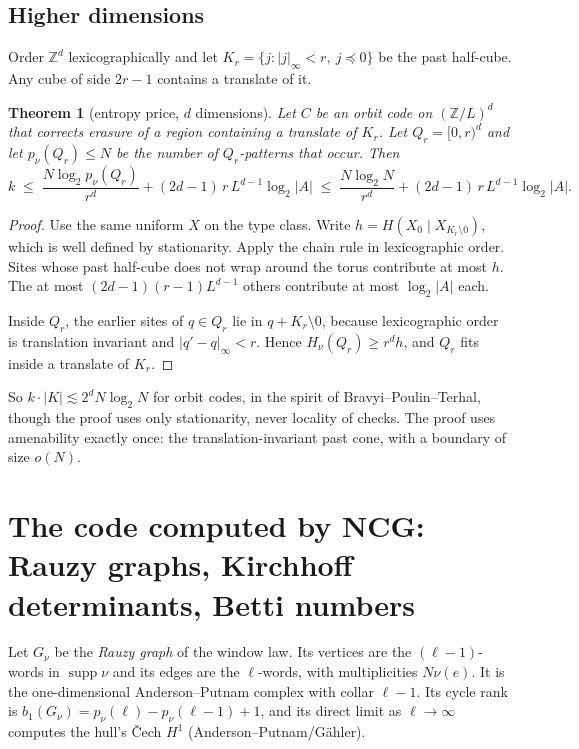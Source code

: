 \documentclass[11pt]{article}
\newtheorem{theorem}{Theorem}[section]
\theoremstyle{definition}
\theoremstyle{remark}
\newcommand{\Z}{\mathbb Z}
\newcommand{\supp}{\operatorname{supp}}
\begin{document}
\subsection{Higher dimensions}
Order $\Z^d$ lexicographically and let $K_r=\{j:|j|_\infty<r,\ j\preceq0\}$ be the past half-cube. Any cube of side $2r-1$ contains a translate of it.

\begin{theorem}[entropy price, $d$ dimensions]\label{thm:priced}
Let $C$ be an orbit code on $(\Z/L)^d$ that corrects erasure of a region containing a translate of $K_r$. Let $Q_r=[0,r)^d$ and let $p_\nu(Q_r)\le N$ be the number of $Q_r$-patterns that occur. Then
\[k\;\le\;\frac{N\log_2p_\nu(Q_r)}{r^d}+(2d-1)\,r\,L^{d-1}\log_2|A|\;\le\;\frac{N\log_2N}{r^d}+(2d-1)\,r\,L^{d-1}\log_2|A|.\]
\end{theorem}

\begin{proof}
Use the same uniform $X$ on the type class. Write $h=H(X_0\mid X_{K_r\setminus0})$, which is well defined by stationarity. Apply the chain rule in lexicographic order. Sites whose past half-cube does not wrap around the torus contribute at most $h$. The at most $(2d-1)(r-1)L^{d-1}$ others contribute at most $\log_2|A|$ each.

Inside $Q_r$, the earlier sites of $q\in Q_r$ lie in $q+K_r\setminus0$, because lexicographic order is translation invariant and $|q'-q|_\infty<r$. Hence $H_\nu(Q_r)\ge r^dh$, and $Q_r$ fits inside a translate of $K_r$.
\end{proof}

So $k\cdot|K|\lesssim2^dN\log_2N$ for orbit codes, in the spirit of Bravyi--Poulin--Terhal, though the proof uses only stationarity, never locality of checks. The proof uses amenability exactly once: the translation-invariant past cone, with a boundary of size $o(N)$.

\section{The code computed by NCG: Rauzy graphs, Kirchhoff determinants, Betti numbers}

Let $G_\nu$ be the \emph{Rauzy graph} of the window law. Its vertices are the $(\ell-1)$-words in $\supp\nu$ and its edges are the $\ell$-words, with multiplicities $N\nu(e)$. It is the one-dimensional Anderson--Putnam complex with collar $\ell-1$. Its cycle rank is $b_1(G_\nu)=p_\nu(\ell)-p_\nu(\ell-1)+1$, and its direct limit as $\ell\to\infty$ computes the hull's \v{C}ech $H^1$ (Anderson--Putnam/Gähler).
\end{document}

